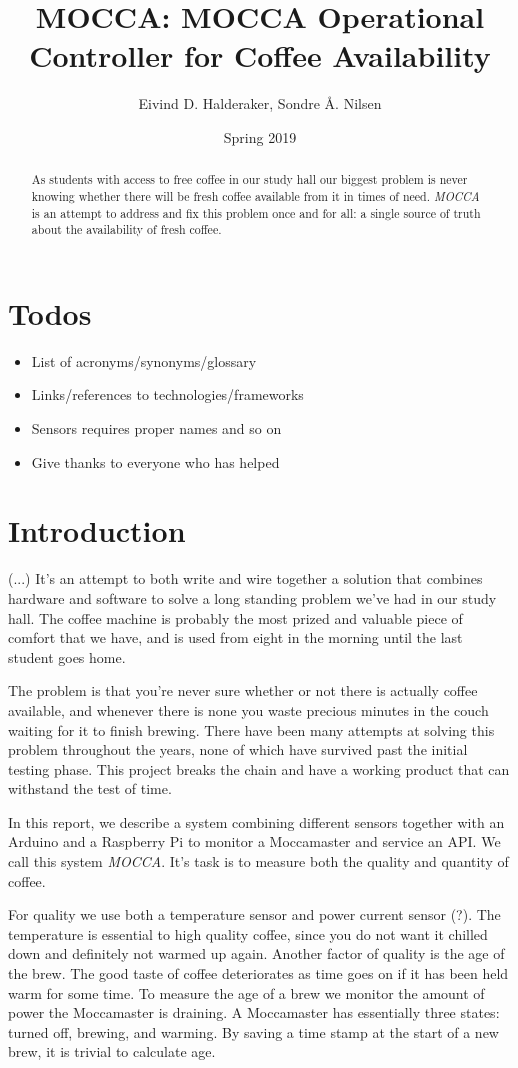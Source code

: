 \documentclass[12pt,a4paper,oneside,article]{memoir}
\title{MOCCA: MOCCA Operational Controller for Coffee Availability}
\author{Eivind D. Halderaker, Sondre Å. Nilsen}
\date{Spring 2019}
\numberwithin{equation}{chapter}
\begin{document}


\tableofcontents

\begin{abstract}
  As students with access to free coffee in our study hall our biggest problem
  is never knowing whether there will be fresh coffee available from it in times
  of need. \textit{MOCCA} is an attempt to address and fix this problem once and
  for all: a single source of truth about the availability of fresh coffee.
\end{abstract}

\section{Todos}
\begin{itemize}
\item List of acronyms/synonyms/glossary
\item Links/references to technologies/frameworks
\item Sensors requires proper names and so on
\item Give thanks to everyone who has helped
\end{itemize}

\section{Introduction}\label{sec:introduction}
(...) It's an attempt to both write and wire together a solution that combines 
hardware and software to solve a long
standing problem we've had in our study hall. The coffee machine is probably the
most prized and valuable piece of comfort that we have, and is used from eight
in the morning until the last student goes home.

The problem is that you're never sure whether or not there is actually
coffee available, and whenever there is none you waste precious minutes in the
couch waiting for it to finish brewing. There have been many attempts at solving
this problem throughout the years, none of which have survived past the initial
testing phase. This project breaks the chain and have a working product
that can withstand the test of time.

In this report, we describe a system combining different sensors together with 
an Arduino and a Raspberry Pi to monitor a Moccamaster and service 
an API. We call this system \textit{MOCCA}. It's task is to measure both the 
quality and quantity of coffee. 

For quality we use both a temperature sensor 
and power current sensor (?). The temperature is essential to high quality 
coffee, since you do not want it chilled down and definitely not warmed 
up again. Another factor of quality is the age of the brew. The good taste of 
coffee deteriorates as time goes on if it has been held warm for some time. To 
measure the age of a brew we monitor the amount of power the Moccamaster is 
draining. A Moccamaster has essentially three states: turned off, brewing, 
and warming. By saving a time stamp at the start of a new brew, it is trivial 
to calculate age.
\end{document}
